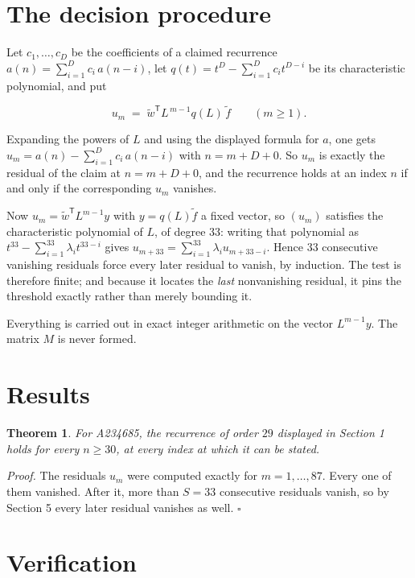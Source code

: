 \documentclass[11pt]{article}
\newtheorem{theorem}{Theorem}
\theoremstyle{definition}
\begin{document}
\section{The decision procedure}

Let $c_1,\dots,c_D$ be the coefficients of a claimed recurrence $a(n) = \sum_{i=1}^{D} c_i\,a(n-i)$, let $q(t) = t^{D} - \sum_{i=1}^{D} c_i t^{D-i}$ be its characteristic polynomial, and put

\[u_m \;=\; \tilde w^{\mathsf T} L^{\,m-1} q(L)\,\tilde f \qquad (m \ge 1).\]

Expanding the powers of $L$ and using the displayed formula for $a$, one gets $u_m = a(n) - \sum_{i=1}^{D} c_i\,a(n-i)$ with $n = m + D + 0$. So $u_m$ is exactly the residual of the claim at $n = m + D + 0$, and the recurrence holds at an index $n$ if and only if the corresponding $u_m$ vanishes.

Now $u_m = \tilde w^{\mathsf T} L^{m-1} y$ with $y = q(L)\tilde f$ a fixed vector, so $(u_m)$ satisfies the characteristic polynomial of $L$, of degree $33$: writing that polynomial as $t^{33} - \sum_{i=1}^{33} \lambda_i t^{33-i}$ gives $u_{m+33} = \sum_{i=1}^{33} \lambda_i u_{m+33-i}$. Hence $33$ consecutive vanishing residuals force every later residual to vanish, by induction. The test is therefore finite; and because it locates the {\itshape last} nonvanishing residual, it pins the threshold exactly rather than merely bounding it.

Everything is carried out in exact integer arithmetic on the vector $L^{m-1}y$. The matrix $M$ is never formed.

\section{Results}

\begin{theorem} For A234685, the recurrence of order $29$ displayed in Section 1 holds for every $n \ge 30$, at every index at which it can be stated.\end{theorem}

{\itshape Proof.} The residuals $u_m$ were computed exactly for $m = 1,\dots,87$. Every one of them vanished. After it, more than $S = 33$ consecutive residuals vanish, so by Section 5 every later residual vanishes as well. $\square$

\section{Verification}
\end{document}
